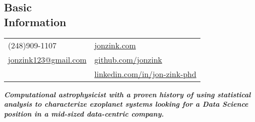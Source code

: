\documentclass[margin,line, 12pt]{res}
\begin{document}
\begin{spacing}{0.98}	


\begin{resume}
\vspace*{-2mm}
\section{Basic\\Information}
\begin{tabular}{@{}p{4.75in}p{4in}}
  (248)909-1107 &  \href{https://www.jonzink.com}{jonzink.com}  \\
  \href{mailto:jonzink123@gmail.com}{jonzink123@gmail.com} & \href{https://github.com/jonzink}{github.com/jonzink} \\
  
  & \href{https://www.linkedin.com/in/jon-zink-phd/}{linkedin.com/in/jon-zink-phd} \\
\end{tabular}

\vspace{-3mm}
\textbf{\textit{\color{RoyalBlue} Computational astrophysicist with a proven history of using statistical analysis to characterize exoplanet systems looking for a Data Science position in a mid-sized data-centric company.}}
\vspace{-3mm}


\end{resume}
\end{spacing}
\end{document}
